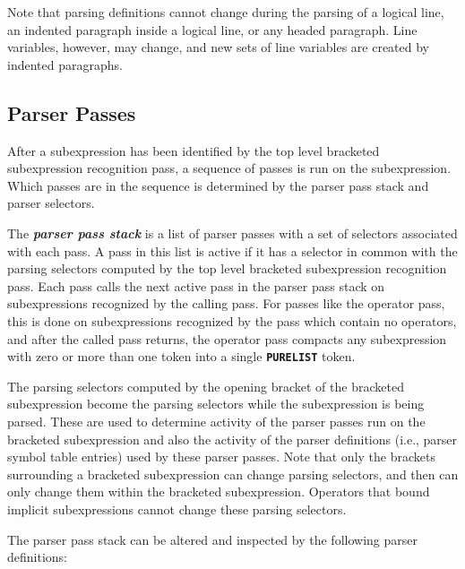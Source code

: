 \documentclass[12pt]{article}
\newcommand{\TT}[1]{{\tt \bfseries #1}}
\newcommand{\key}[1]{{\bf \em #1}\index{#1}}
\begin{document}
Note that parsing definitions cannot change during the parsing of
a logical line, an indented paragraph inside a logical line,
or any headed paragraph.  Line variables, however, may change,
and new sets of line variables are created by indented paragraphs.


\subsection{Parser Passes}

After a subexpression has been identified by the top level bracketed
subexpression recognition pass, a sequence of passes is run on the
subexpression.  Which passes are in the sequence is determined by the
parser pass stack and parser selectors.

The \key{parser pass stack} is a list of parser passes with a set of
selectors associated with each pass.  A pass in this list is active
if it has a selector in common with the parsing selectors computed
by the top level bracketed subexpression recognition pass.  Each pass
calls the next active pass in the parser pass stack on subexpressions
recognized by the calling pass.  For passes like the operator pass,
this is done on subexpressions recognized by the pass which contain
no operators, and after the called pass returns, the operator pass
compacts any subexpression with zero or more than one token into
a single \TT{PURELIST} token.

The parsing selectors
computed by the opening bracket of the bracketed subexpression
become the parsing selectors while the subexpression is being parsed.
These are used to determine activity of the parser passes run on the bracketed
subexpression and also the activity
of the parser definitions (i.e., parser symbol table entries)
used by these parser passes.
Note that only the brackets surrounding a bracketed subexpression
can change parsing selectors, and then can only change them within
the bracketed subexpression.  Operators
that bound implicit subexpressions cannot change these parsing selectors.

The parser pass stack can be altered and inspected
by the following parser definitions:
\end{document}
